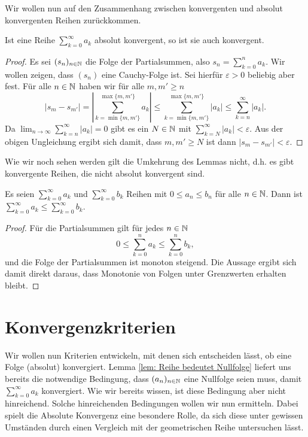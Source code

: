 \documentclass[a4paper,10pt]{article}
\begin{document}
Wir wollen nun auf den Zusammenhang zwischen konvergenten und absolut konvergenten Reihen zurückkommen.


\begin{lem}
 Ist eine Reihe $\sum_{k=0}^\infty a_k$ absolut konvergent, so ist sie auch konvergent.
\end{lem}
\begin{proof}
 Es sei $(s_n)_{n \in \mathbb{N}}$ die Folge der Partialsummen, also $s_n = \sum_{k=0}^n a_k$. Wir wollen zeigen, dass $(s_n)$ eine Cauchy-Folge ist. Sei hierfür $\varepsilon > 0$ beliebig aber fest. Für alle $n \in \mathbb{N}$ haben wir für alle $m, m' \geq n$
 \[
  |s_m - s_{m'}|
  = \left| \sum_{k=\min\{m,m'\}}^{\max\{m,m'\}} a_k \right|
  \leq \sum_{k=\min\{m,m'\}}^{\max\{m,m'\}} |a_k|
  \leq \sum_{k=n}^\infty |a_k|.
 \]
 Da $\lim_{n \to \infty} \sum_{k=n}^\infty |a_k| = 0$ gibt es ein $N \in \mathbb{N}$ mit $\sum_{k=N}^\infty |a_k| < \varepsilon$. Aus der obigen Ungleichung ergibt sich damit, dass $m, m' \geq N$ ist dann $|s_m - s_{m'}| < \varepsilon$.
\end{proof}


Wie wir noch sehen werden gilt die Umkehrung des Lemmas nicht, d.h. es gibt konvergente Reihen, die nicht absolut konvergent sind.


\begin{lem}
 Es seien $\sum_{k=0}^\infty a_k$ und $\sum_{k=0}^\infty b_k$ Reihen mit $0 \leq a_n \leq b_n$ für alle $n \in \mathbb{N}$. Dann ist $\sum_{k=0}^\infty a_k \leq \sum_{k=0}^\infty b_k$.
\end{lem}
\begin{proof}
 Für die Partialsummen gilt für jedes $n \in \mathbb{N}$
 \[
  0 \leq \sum_{k=0}^n a_k \leq \sum_{k=0}^n b_k,
 \]
 und die Folge der Partialsummen ist monoton steigend. Die Aussage ergibt sich damit direkt daraus, dass Monotonie von Folgen unter Grenzwerten erhalten bleibt.
\end{proof}





\section{Konvergenzkriterien}


Wir wollen nun Kriterien entwickeln, mit denen sich entscheiden lässt, ob eine Folge (absolut) konvergiert. Lemma \ref{lem: Reihe bedeutet Nullfolge} liefert uns bereits die notwendige Bedingung, dass $(a_n)_{n \in \mathbb{N}}$ eine Nullfolge seien muss, damit $\sum_{k=0}^\infty a_k$ konvergiert. Wie wir bereits wissen, ist diese Bedingung aber nicht hinreichend. Solche hinreichenden Bedingungen wollen wir nun ermitteln. Dabei spielt die Absolute Konvergenz eine besondere Rolle, da sich diese unter gewissen Umständen durch einen Vergleich mit der geometrischen Reihe untersuchen lässt.
\end{document}
